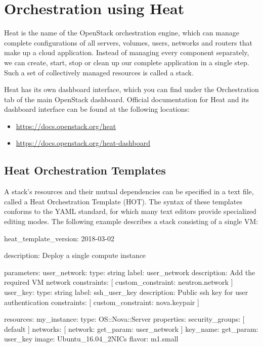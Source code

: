 \chapter{Orchestration using Heat}
\gls{Heat} is the name of the OpenStack orchestration engine, which
can manage complete configurations of all servers, volumes, users,
networks and routers that make up a cloud application.  Instead of
managing every component separately, we can create, start, stop or
clean up our complete application in a single step.  Such a set of
collectively managed resources is called a \gls{stack}.

\gls{Heat} has its own dashboard interface, which you can find under
the Orchestration tab of the main OpenStack dashboard.  Official
documentation for Heat and its dashboard interface can be found at the
following locations:
\begin{itemize}
\item \url{https://docs.openstack.org/heat}
\item \url{https://docs.openstack.org/heat-dashboard}
\end{itemize}

\section{\gls{Heat Orchestration Template}s}
A \gls{stack}'s resources and their mutual dependencies can be
specified in a text file, called a \gls{Heat Orchestration Template}
(\textsc{HOT}).  The syntax of these templates conforms to the
\gls{YAML} standard, for which many text editors provide specialized
editing modes.  The following example describes a stack consisting of
a single VM:
\begin{code}{}
heat_template_version: 2018-03-02

description: Deploy a single compute instance

parameters:
  user_network:
    type: string
    label: user_network
    description: Add the required VM network
    constraints: [ custom_constraint: neutron.network ]
  user_key:
    type: string
    label: ssh_user_key
    description: Public ssh key for user authentication
    constraints: [ custom_constraint: nova.keypair ]

resources:
  my_instance:
    type: OS::Nova::Server
    properties:
      security_groups: [ default ]
      networks: [ network: { get_param: user_network } ]
      key_name: { get_param: user_key }
      image: Ubuntu_16.04_2NICs
      flavor: m1.small
\end{code}

